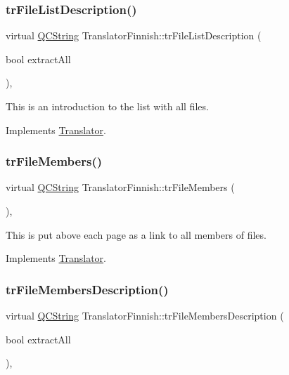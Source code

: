 \subsubsection{\texorpdfstring{trFileListDescription()}{trFileListDescription()}}
{\footnotesize\ttfamily virtual \mbox{\hyperlink{class_q_c_string}{Q\+C\+String}} Translator\+Finnish\+::tr\+File\+List\+Description (\begin{DoxyParamCaption}\item[{bool}]{extract\+All }\end{DoxyParamCaption})\hspace{0.3cm}{\ttfamily [inline]}, {\ttfamily [virtual]}}

This is an introduction to the list with all files. 

Implements \mbox{\hyperlink{class_translator}{Translator}}.

\mbox{\label{class_translator_finnish_a1b893144c35e0a2722df35f35ba9ad92}} 
\subsubsection{\texorpdfstring{trFileMembers()}{trFileMembers()}}
{\footnotesize\ttfamily virtual \mbox{\hyperlink{class_q_c_string}{Q\+C\+String}} Translator\+Finnish\+::tr\+File\+Members (\begin{DoxyParamCaption}{ }\end{DoxyParamCaption})\hspace{0.3cm}{\ttfamily [inline]}, {\ttfamily [virtual]}}

This is put above each page as a link to all members of files. 

Implements \mbox{\hyperlink{class_translator}{Translator}}.

\mbox{\label{class_translator_finnish_a316bafc9459970e52b0b0d90d64f8e41}} 
\subsubsection{\texorpdfstring{trFileMembersDescription()}{trFileMembersDescription()}}
{\footnotesize\ttfamily virtual \mbox{\hyperlink{class_q_c_string}{Q\+C\+String}} Translator\+Finnish\+::tr\+File\+Members\+Description (\begin{DoxyParamCaption}\item[{bool}]{extract\+All }\end{DoxyParamCaption})\hspace{0.3cm}{\ttfamily [inline]}, {\ttfamily [virtual]}}

